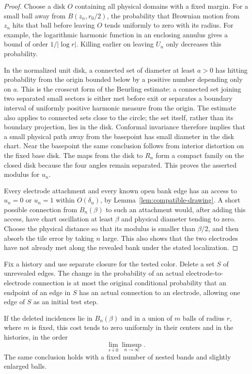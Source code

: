 \begin{proof}
Choose a disk $O$ containing all physical domains with a fixed margin.
For a small ball away from $B(z_n,r_0/2)$, the probability that Brownian
motion from $z_n$ hits that ball before leaving $O$ tends uniformly to
zero with its radius.  For example, the logarithmic harmonic function
in an enclosing annulus gives a bound of order
$1/|\log r|$.  Killing earlier on leaving $U_n$ only decreases this
probability.

In the normalized unit disk, a connected set of diameter at least
$a>0$ has hitting probability from the origin bounded below by a
positive number depending only on $a$.  This is the crosscut form of
the Beurling estimate: a connected set joining two separated small
sectors is either met before exit or separates a boundary interval
of uniformly positive harmonic measure from the origin.  The estimate
also applies to connected sets close to the circle; the set itself,
rather than its boundary projection, lies in the disk.  Conformal
invariance therefore implies that a small physical path away from
the basepoint has small diameter in the disk chart.  Near the basepoint
the same conclusion follows from interior distortion on the fixed
base disk.  The maps from the disk to $R_n$ form a compact family on
the closed disk because the four angles remain separated.  This
proves the asserted modulus for $u_n$.

Every electrode attachment and every known open bank edge has an
access to $u_n=0$ or $u_n=1$ within $O(\delta_n)$, by
Lemma~\ref{lem:compatible-drawing}.  A short possible connection
from $B_n(\beta)$ to such an attachment would, after adding this
access, have chart oscillation at least $\beta$ and physical diameter
tending to zero.  Choose the physical distance so that its modulus
is smaller than $\beta/2$, and then absorb the tile error by taking
$n$ large.  This also shows that the two electrodes have not already
met along the revealed bank under the stated localization.
\end{proof}

\begin{lemma}\label{lem:slits-deletion}
Fix a history and use separate closure for the tested color.  Delete
a set $S$ of unrevealed edges.  The change in the probability of an
actual electrode-to-electrode connection is at most the original
conditional probability that an endpoint of an edge in $S$ has an
actual connection to an electrode, allowing one edge of $S$ as an
initial test step.

If the deleted incidences lie in $B_n(\beta)$ and in a union of $m$
balls of radius $r$, where $m$ is fixed, this cost tends to zero
uniformly in their centers and in the histories, in the order
\[
 \lim_{r\downarrow0}\limsup_{n\to\infty}.
\]
The same conclusion holds with a fixed number of nested bands and
slightly enlarged balls.
\end{lemma}

